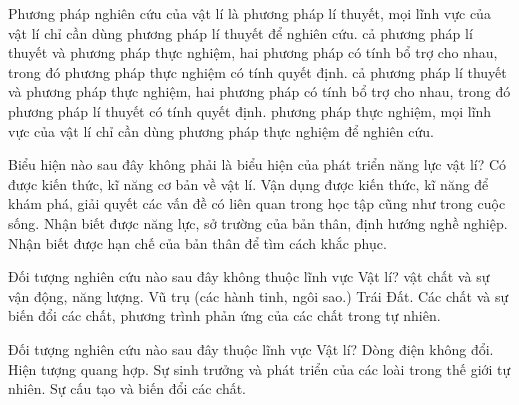 \begin{ex}
Phương pháp nghiên cứu của vật lí là
\choice
{phương pháp lí thuyết, mọi lĩnh vực của vật lí chỉ cần dùng phương pháp lí thuyết để nghiên cứu.}
{\True cả phương pháp lí thuyết và phương pháp thực nghiệm, hai phương pháp có tính bổ trợ cho nhau, trong đó phương pháp thực nghiệm có tính quyết định.}
{cả phương pháp lí thuyết và phương pháp thực nghiệm, hai phương pháp có tính bổ trợ cho nhau, trong đó phương pháp lí thuyết có tính quyết định.}
{phương pháp thực nghiệm, mọi lĩnh vực của vật lí chỉ cần dùng phương pháp thực nghiệm để nghiên cứu.}
\end{ex}

\begin{ex}
Biểu hiện nào sau đây không phải là biểu hiện của phát triển năng lực vật lí?
\choice
{Có được kiến thức, kĩ năng cơ bản về vật lí.}
{Vận dụng được kiến thức, kĩ năng để khám phá, giải quyết các vấn đề có liên quan trong học tập cũng như trong cuộc sống.}
{\True Nhận biết được năng lực, sở trường của bản thân, định hướng nghề nghiệp.}
{Nhận biết được hạn chế của bản thân để tìm cách khắc phục.}
\end{ex}

\begin{ex}
Đối tượng nghiên cứu nào sau đây không thuộc lĩnh vực Vật lí?
\choice
{vật chất và sự vận động, năng lượng.}
{Vũ trụ (các hành tinh, ngôi sao.)}
{Trái Đất.}
{\True Các chất và sự biến đổi các chất, phương trình phản ứng của các chất trong tự nhiên.}
\end{ex}

\begin{ex}
Đối tượng nghiên cứu nào sau đây thuộc lĩnh vực Vật lí?
\choice
{\True Dòng điện không đổi.}
{Hiện tượng quang hợp.}
{Sự sinh trưởng và phát triển của các loài trong thế giới tự nhiên.}
{Sự cấu tạo và biến đổi các chất.}
\end{ex}


